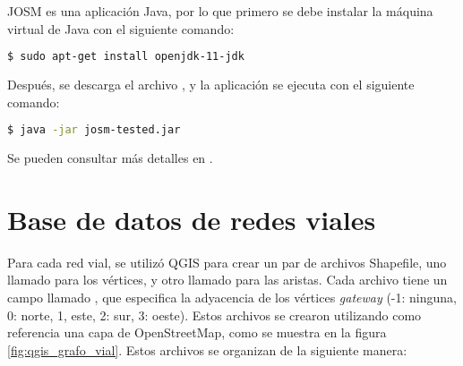 JOSM es una aplicación Java, por lo que primero se debe instalar la máquina
virtual de Java con el siguiente comando:

\begin{lstlisting}[language=bash]
$ sudo apt-get install openjdk-11-jdk
\end{lstlisting}

Después, se descarga el archivo
\href{https://josm.openstreetmap.de/wiki/Download}{}, y
la aplicación se ejecuta con el siguiente comando:

\begin{lstlisting}[language=bash]
$ java -jar josm-tested.jar
\end{lstlisting}

Se pueden consultar más detalles en \cite{DescargaJOSM}.

\section{Base de datos de redes viales}
\label{sec:creacion_base_de_la_datos_de_redes_viales}

Para cada red vial, se utilizó QGIS para crear un par de archivos Shapefile, uno
llamado  para los vértices, y otro llamado 
para las aristas. Cada archivo  tiene un campo llamado
, que especifica la adyacencia de los vértices \textit{gateway}
(-1: ninguna, 0: norte, 1, este, 2: sur, 3: oeste). Estos archivos se crearon
utilizando como referencia una capa de OpenStreetMap, como se muestra en la
figura \ref{fig:qgis_grafo_vial}. Estos archivos se organizan de la siguiente
manera:



